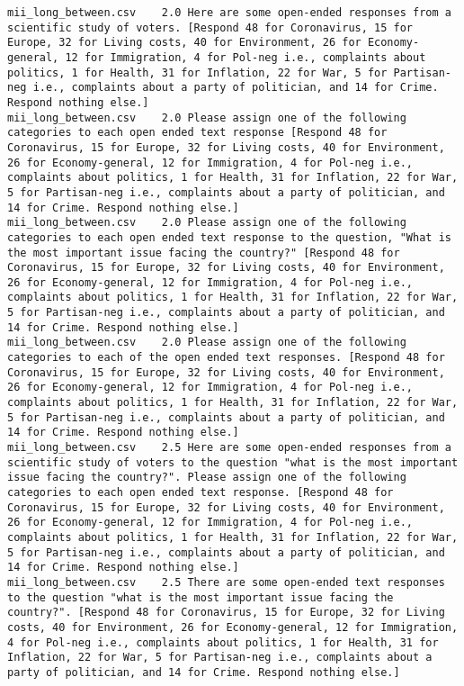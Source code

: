 \begin{lstlisting}[label=lst:promptvariants]
mii_long_between.csv	2.0	Here are some open-ended responses from a scientific study of voters. [Respond 48 for Coronavirus, 15 for Europe, 32 for Living costs, 40 for Environment, 26 for Economy-general, 12 for Immigration, 4 for Pol-neg i.e., complaints about politics, 1 for Health, 31 for Inflation, 22 for War, 5 for Partisan-neg i.e., complaints about a party of politician, and 14 for Crime. Respond nothing else.]
mii_long_between.csv	2.0	Please assign one of the following categories to each open ended text response [Respond 48 for Coronavirus, 15 for Europe, 32 for Living costs, 40 for Environment, 26 for Economy-general, 12 for Immigration, 4 for Pol-neg i.e., complaints about politics, 1 for Health, 31 for Inflation, 22 for War, 5 for Partisan-neg i.e., complaints about a party of politician, and 14 for Crime. Respond nothing else.]
mii_long_between.csv	2.0	Please assign one of the following categories to each open ended text response to the question, "What is the most important issue facing the country?" [Respond 48 for Coronavirus, 15 for Europe, 32 for Living costs, 40 for Environment, 26 for Economy-general, 12 for Immigration, 4 for Pol-neg i.e., complaints about politics, 1 for Health, 31 for Inflation, 22 for War, 5 for Partisan-neg i.e., complaints about a party of politician, and 14 for Crime. Respond nothing else.]
mii_long_between.csv	2.0	Please assign one of the following categories to each of the open ended text responses. [Respond 48 for Coronavirus, 15 for Europe, 32 for Living costs, 40 for Environment, 26 for Economy-general, 12 for Immigration, 4 for Pol-neg i.e., complaints about politics, 1 for Health, 31 for Inflation, 22 for War, 5 for Partisan-neg i.e., complaints about a party of politician, and 14 for Crime. Respond nothing else.]
mii_long_between.csv	2.5	Here are some open-ended responses from a scientific study of voters to the question "what is the most important issue facing the country?". Please assign one of the following categories to each open ended text response. [Respond 48 for Coronavirus, 15 for Europe, 32 for Living costs, 40 for Environment, 26 for Economy-general, 12 for Immigration, 4 for Pol-neg i.e., complaints about politics, 1 for Health, 31 for Inflation, 22 for War, 5 for Partisan-neg i.e., complaints about a party of politician, and 14 for Crime. Respond nothing else.]
mii_long_between.csv	2.5	There are some open-ended text responses to the question "what is the most important issue facing the country?". [Respond 48 for Coronavirus, 15 for Europe, 32 for Living costs, 40 for Environment, 26 for Economy-general, 12 for Immigration, 4 for Pol-neg i.e., complaints about politics, 1 for Health, 31 for Inflation, 22 for War, 5 for Partisan-neg i.e., complaints about a party of politician, and 14 for Crime. Respond nothing else.]

\end{lstlisting}
